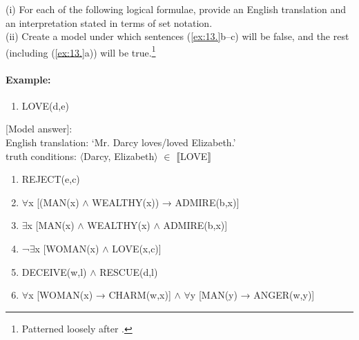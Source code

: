 \begin{stylepoints}
(i) For each of the following logical formulae, provide an English translation and an interpretation stated in terms of set notation.\\
(ii) Create a model under which sentences (\ref{ex:13.}b--c) will be false, and the rest (including (\ref{ex:13.}a)) will be true.\footnote{Patterned loosely after \citet[350]{Saeed2009}.}
\end{stylepoints}

\paragraph*{Example:}
\begin{enumerate}
\item LOVE(d,e)
\end{enumerate}

\textsf{[Model answer]:\\
English translation: ‘Mr. Darcy loves/loved Elizabeth.’\\
truth conditions:} $\langle$\textsf{Darcy, Elizabeth}$\rangle$\textsf{} ${\in}$\textsf{} $\llbracket$\textsf{LOVE}$\rrbracket$ 

\begin{enumerate}
\item REJECT(e,c)
\item ${\forall}$x [(MAN(x) $\wedge$ WEALTHY(x)) → ADMIRE(b,x)]
\item ${\exists}$x [MAN(x) $\wedge$ WEALTHY(x) $\wedge$ ADMIRE(b,x)]
\item ¬${\exists}$x [WOMAN(x) $\wedge$ LOVE(x,c)]
\item DECEIVE(w,l) $\wedge$ RESCUE(d,l)
\item ${\forall}$x [WOMAN(x) → CHARM(w,x)] $\wedge$ ${\forall}$y [MAN(y) → ANGER(w,y)]
\end{enumerate}

